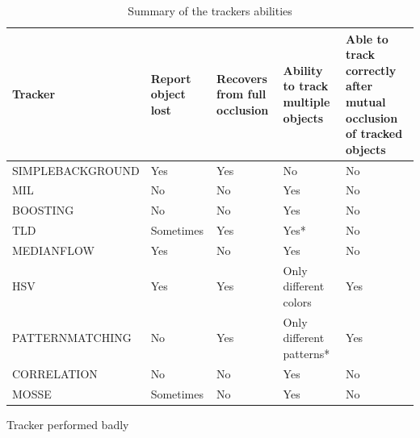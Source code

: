 \begin{landscape}
\begin{table}
\centering
\begin{tabular}{p{5cm}|p{3cm}|p{4cm}|p{5cm}|p{5cm}}
Tracker & Report object lost & Recovers from full occlusion & Ability to track multiple objects & Able to track correctly after mutual occlusion of tracked objects \\
\hline
SIMPLEBACKGROUND & Yes & Yes & No & No \\
MIL & No & No  & Yes & No \\
BOOSTING & No & No & Yes & No \\
TLD & Sometimes & Yes & Yes* & No \\
MEDIANFLOW & Yes & No & Yes & No \\
HSV & Yes & Yes & Only different colors & Yes \\
PATTERNMATCHING & No & Yes & Only different patterns* & Yes \\
CORRELATION & No & No & Yes & No \\
MOSSE & Sometimes & No & Yes & No
\end{tabular}
\vspace{1ex}
\raggedright *Tracker performed badly
\caption{Summary of the trackers abilities}
\label{table:occlusion-multiple}
\end{table}
\end{landscape}
